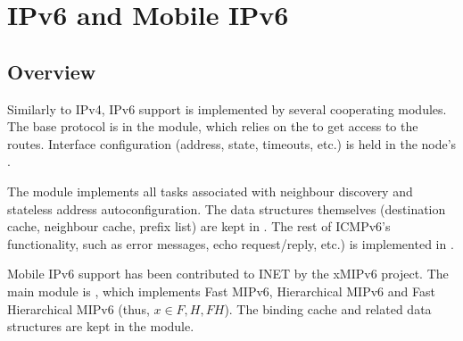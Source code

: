 \chapter{IPv6 and Mobile IPv6}
\label{cha:ipv6}


\section{Overview}
\label{sec:ipv6:overview}

Similarly to IPv4, IPv6 support is implemented by several cooperating modules.
The base protocol is in the  module, which relies on the
 to get access to the routes. Interface configuration
(address, state, timeouts, etc.) is held in the node's .

The  module implements all tasks associated with
neighbour discovery and stateless address autoconfiguration. The data structures
themselves (destination cache, neighbour cache, prefix list) are kept in
. The rest of ICMPv6's functionality, such as error messages,
echo request/reply, etc.) is implemented in .

Mobile IPv6 support has been contributed to INET by the xMIPv6 project.
The main module is , which implements Fast MIPv6, Hierarchical MIPv6
and Fast Hierarchical MIPv6 (thus, $x \in {F, H, FH}$). The binding cache and
related data structures are kept in the  module.



